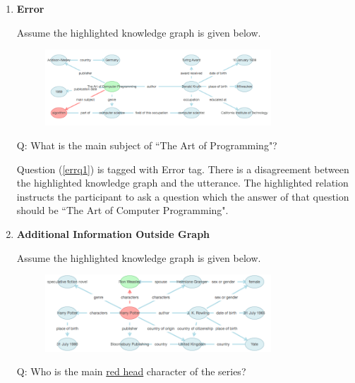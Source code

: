 \documentclass[bsc,frontabs,twoside,singlespacing,parskip,deptreport]{infthesis}     %
\begin{document}
\begin{enumerate}
\item \textbf{Error}

Assume the highlighted knowledge graph is given below.

\begin{figure}[h]
    \centering
    \includegraphics[width=0.8\textwidth]{error.png}
\end{figure}

\begin{exe}
	\ex
		\begin{xlist}
			\ex \label{errq1} Q: What is the main subject of ``The Art of Programming"?
\end{xlist}
\end{exe}

Question (\ref{errq1}) is tagged with Error tag. There is a disagreement between the highlighted knowledge graph and the utterance. The highlighted relation instructs the participant to ask a question which the answer of that question should be ``The Art of Computer Programming".



\item \textbf{Additional Information Outside Graph}

Assume the highlighted knowledge graph is given below.

\begin{figure}[h]
    \centering
    \includegraphics[width=0.8\textwidth]{aiog.png}
\end{figure}

\begin{exe}
	\ex
		\begin{xlist}
			\ex \label{errq1} Q: Who is the main \underline{red head} character of the series?
\end{xlist}
\end{exe}


\end{enumerate}
\end{document}
